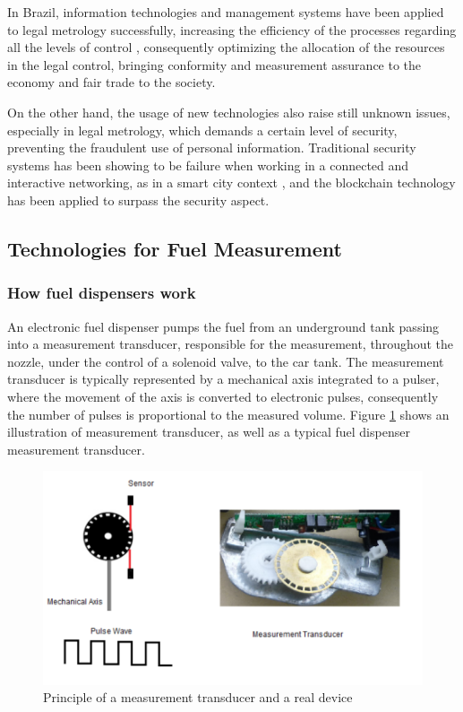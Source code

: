 \documentclass[sigplan]{acmart}
\begin{document}
In Brazil, information technologies and management systems have been applied to legal metrology successfully, increasing the efficiency of the processes regarding all the levels of control \cite{RodriguesFilho2015a}, consequently optimizing the allocation of the resources in the legal control, bringing conformity and measurement assurance to the economy and fair trade to the society.

On the other hand, the usage of new technologies also raise still unknown issues, especially in legal metrology, which demands a certain level of security, preventing the fraudulent use of personal information. Traditional security systems has been showing to be failure when working in a connected and interactive networking, as in a smart city context \cite{Biswas2016}, and the blockchain technology has  been applied to surpass the security aspect.

\subsection{Technologies for Fuel Measurement}
\subsubsection{How fuel dispensers work}
An electronic fuel dispenser pumps the fuel from an underground tank passing into a measurement transducer, responsible for the measurement, throughout the nozzle, under the control of a solenoid valve, to the car tank. The measurement transducer is typically represented by a mechanical axis integrated to a pulser, where the movement of the axis is converted to electronic pulses, consequently the number of pulses is proportional to the measured volume. Figure \ref{f:transducer} shows an illustration of measurement transducer, as well as a typical fuel dispenser measurement transducer.

\begin{figure}[!t]
\centering
\includegraphics[width=.45\textwidth]{transducer}
\caption{Principle of a measurement transducer and a real device}
\label{f:transducer}
\end{figure}
\end{document}
